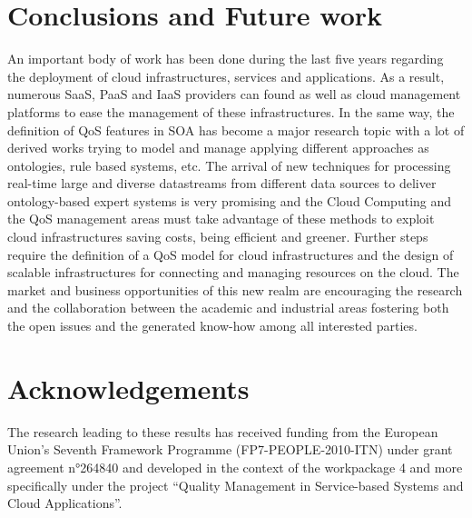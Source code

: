 \documentclass[preprint,12pt]{elsarticle}
\begin{document}
\section{Conclusions and Future work}\label{sect:conclusions}
An important body of work has been done during the last five years regarding the
deployment of cloud infrastructures, services and applications. As a result,
numerous SaaS, PaaS and IaaS providers can found as well as cloud management
platforms to ease the management of these infrastructures. In the same way, the
definition of QoS features in SOA has become a major research topic with a lot
of derived works trying to model and manage applying different approaches as
ontologies, rule based systems, etc. The arrival of new techniques for
processing real-time large and diverse datastreams from different data sources
to deliver ontology-based expert systems is very promising and the Cloud
Computing and the QoS management areas must take advantage of these methods to exploit cloud
infrastructures saving costs, being efficient and greener. Further steps require
the definition of a QoS model for cloud infrastructures and the design of
scalable infrastructures for connecting and managing resources on the cloud. The
market and business opportunities of this new realm are encouraging the research and the
collaboration between the academic and industrial areas fostering both the open
issues and the generated know-how among all interested parties.

\section{Acknowledgements}\label{sect:ack}
The research leading to these results has received funding from the European Union’s Seventh Framework Programme (FP7-PEOPLE-2010-ITN) 
under grant agreement n°264840 and developed in the context of the workpackage 4 and more specifically under the project 
``Quality Management in Service-based Systems and Cloud Applications''.



% 
%


\end{document}
